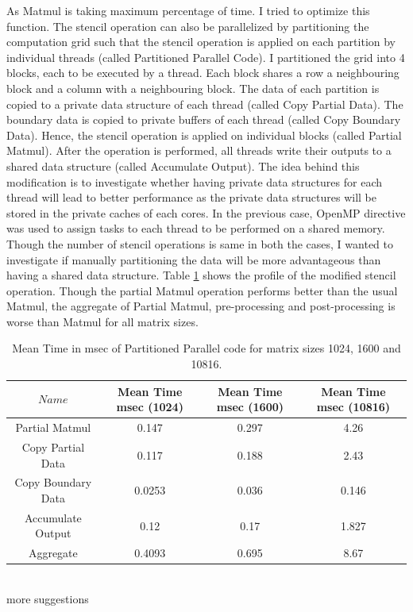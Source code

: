 \documentclass{article}
\begin{document}
\begin{spacing}{1.1}
As Matmul is taking maximum percentage of time. I tried to optimize this function. The stencil operation can also be parallelized by partitioning the computation grid such that the stencil operation is applied on each partition by individual threads (called Partitioned Parallel Code). I partitioned the grid into 4 blocks, each to be executed by a thread. Each block shares a row a neighbouring block and a column with a neighbouring block. The data of each partition is copied to a private data structure of each thread (called Copy Partial Data). The boundary data is copied to private buffers of each thread (called Copy Boundary Data).  Hence, the stencil operation is applied on individual blocks (called Partial Matmul). After the operation is performed, all threads write their outputs to a shared data structure (called Accumulate Output). The idea behind this modification is to investigate whether having private data structures for each thread will lead to better performance as the private data structures will be stored in the private caches of each cores. In the previous case, OpenMP directive was used to assign tasks to each thread to be performed on a shared memory. Though the number of stencil operations is same in both the cases, I wanted to investigate if manually partitioning the data will be more advantageous than having a shared data structure.  Table \ref{partition} shows the profile of the modified stencil operation. Though the partial Matmul operation performs better than the usual Matmul, the aggregate of Partial Matmul, pre-processing and post-processing is worse than Matmul for all matrix sizes.


\begin{table}[H]
\begin{center}
 \begin{tabular}{| c | c|c|c|} 
 \hline
$Name$ & Mean Time msec (1024) & Mean Time msec (1600) & Mean Time msec (10816)    \\ %
 \hline
Partial Matmul & 0.147 &  0.297 & 4.26 \\ %
Copy Partial Data & 0.117 &  0.188 & 2.43 \\ %
Copy Boundary Data & 0.0253 & 0.036 & 0.146 \\ %
Accumulate Output & 0.12 &  0.17 & 1.827 \\ %
\cline{2-4}
Aggregate & 0.4093& 0.695 & 8.67\\%
 \hline
\end{tabular}%
\end{center}
\caption{\label{partition} Mean Time in msec of Partitioned Parallel code for matrix sizes 1024, 1600 and 10816. } 
\end{table}
\\
more suggestions


\end{spacing}
\end{document}
